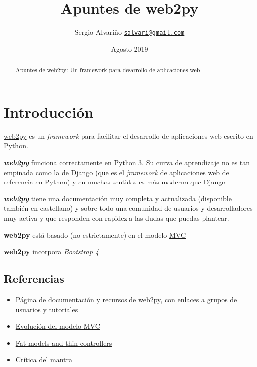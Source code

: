 \documentclass[
  12pt,
  spanish,
]{article}
\title{Apuntes de web2py}
\author{Sergio Alvariño
\href{mailto:salvari@gmail.com}{\nolinkurl{salvari@gmail.com}}}
\date{Agosto-2019}
\providecommand{\tightlist}{%
  \setlength{\itemsep}{0pt}\setlength{\parskip}{0pt}}
\begin{document}
\maketitle
\begin{abstract}
Apuntes de web2py: Un framework para desarrollo de aplicaciones web
\end{abstract}

{
\hypersetup{linkcolor=}
\setcounter{tocdepth}{3}
\tableofcontents
}
\hypertarget{introducciuxf3n}{%
\section{Introducción}\label{introducciuxf3n}}

\href{http://www.web2py.com/}{web2py} es un \emph{framework} para
facilitar el desarrollo de aplicaciones web escrito en Python.

\textbf{\emph{web2py}} funciona correctamente en Python 3. Su curva de
aprendizaje no es tan empinada como la de
\href{https://www.djangoproject.com/}{Django} (que es el
\emph{framework} de aplicaciones web de referencia en Python) y en
muchos sentidos es más moderno que Django.

\textbf{\emph{web2py}} tiene una
\href{http://www.web2py.com/init/default/documentation}{documentación}
muy completa y actualizada (disponible también en castellano) y sobre
todo una comunidad de usuarios y desarrolladores muy activa y que
responden con rapidez a las dudas que puedas plantear.

\textbf{web2py} está basado (no estrictamente) en el modelo
\href{https://es.wikipedia.org/wiki/Modelo\%E2\%80\%93vista\%E2\%80\%93controlador}{MVC}

\textbf{web2py} incorpora \emph{Bootstrap 4}

\hypertarget{referencias}{%
\subsection{Referencias}\label{referencias}}

\begin{itemize}
\tightlist
\item
  \href{http://www.web2py.com/init/default/documentation}{Página de
  documentación y recursos de web2py, con enlaces a grupos de usuarios y
  tutoriales}
\item
  \href{https://martinfowler.com/eaaDev/uiArchs.html}{Evolución del
  modelo MVC}
\item
  \href{https://nomadphp.com/blog/60/working-with-the-thin-controller-and-fat-model-concept-in-laravel}{Fat
  models and thin controllers}
\item
  \href{https://nomadphp.com/blog/60/working-with-the-thin-controller-and-fat-model-concept-in-laravel}{Crítica
  del mantra}
\end{itemize}
\end{document}
